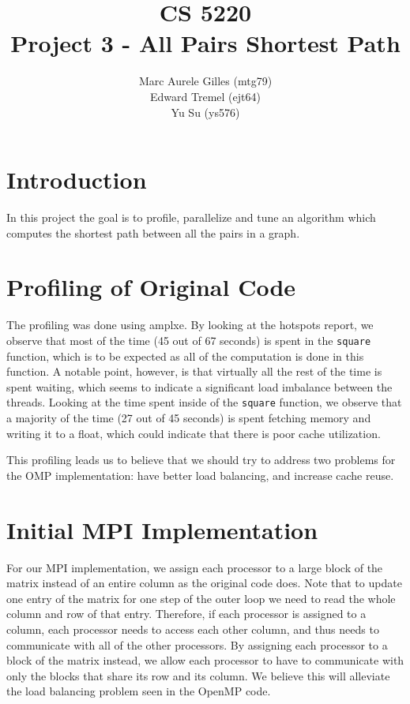 \documentclass[11pt]{article}
\begin{document}
\title{CS 5220\\ Project 3 - All Pairs Shortest Path}
\author{Marc Aurele Gilles (mtg79)\\ Edward Tremel (ejt64) \\ Yu Su (ys576)}
\maketitle

\section{Introduction}
In this project the goal is to profile, parallelize and tune an algorithm which computes the shortest path between all the pairs in a graph.


\section{Profiling of Original Code}
The profiling was done using amplxe. By looking at the hotspots report, we observe that most of the time (45 out of 67 seconds) is spent in the \texttt{square} function, which is to be expected as all of the computation is done in this function. A notable point, however, is that virtually all the rest of the time is spent waiting, which seems to indicate a significant load imbalance between the threads.
Looking at the time spent inside of the \texttt{square} function, we observe that a majority of the time (27 out of 45 seconds) is spent fetching memory and writing it to a float, which could indicate that there is poor cache utilization.

This profiling leads us to believe that we should try to address two problems for the OMP implementation: have better load balancing, and increase cache reuse.



\section{Initial MPI Implementation}
For our MPI implementation, we assign each processor to a large block of the matrix instead of an entire column as the original code does.
Note that to update one entry of the matrix for one step of the outer loop we need to read the whole column and row of that entry. 
Therefore, if each processor is assigned to a column, each processor needs to access each other column, and thus needs to communicate with all of the other processors. 
By assigning each processor to a block of the matrix instead, we allow each processor to have to communicate with only the blocks that share its row and its column.
We believe this will alleviate the load balancing problem seen in the OpenMP code.
\end{document}
